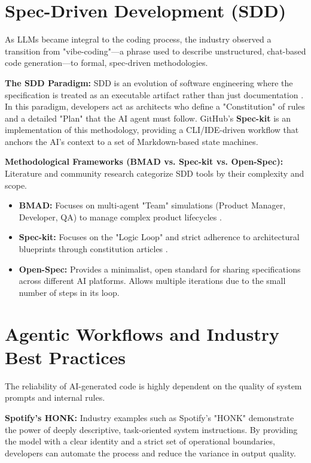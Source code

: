 \documentclass[a4paper,12pt]{report}
\begin{document}
\section{Spec-Driven Development (SDD)}
As LLMs became integral to the coding process, the industry observed a transition from "vibe-coding"—a phrase used to describe unstructured, chat-based code generation—to formal, spec-driven methodologies.

\textbf{The SDD Paradigm:} SDD is an evolution of software engineering where the specification is treated as an executable artifact rather than just documentation \cite{sogl_sdd}. In this paradigm, developers act as architects who define a "Constitution" of rules and a detailed "Plan" that the AI agent must follow. GitHub’s \textbf{Spec-kit} \cite{speckit_repo, gokcek_report} is an implementation of this methodology, providing a CLI/IDE-driven workflow that anchors the AI's context to a set of Markdown-based state machines.

\textbf{Methodological Frameworks (BMAD vs. Spec-kit vs. Open-Spec):} Literature and community research \cite{bmad_repo, bmad_vs_speckit_video} categorize SDD tools by their complexity and scope.
\begin{itemize}
\item \textbf{BMAD:} Focuses on multi-agent "Team" simulations (Product Manager, Developer, QA) to manage complex product lifecycles \cite{bmad_repo}.
\item \textbf{Spec-kit:} Focuses on the "Logic Loop" and strict adherence to architectural blueprints through constitution articles \cite{speckit_const_docs}.
\item \textbf{Open-Spec:} Provides a minimalist, open standard for sharing specifications across different AI platforms. Allows multiple iterations due to the small number of steps in its loop. \cite{openspec_repo}
\end{itemize}

\section{Agentic Workflows and Industry Best Practices}
The reliability of AI-generated code is highly dependent on the quality of system prompts and internal rules.

\textbf{Spotify's HONK:} Industry examples such as Spotify’s "HONK" \cite{spotify_honk} demonstrate the power of deeply descriptive, task-oriented system instructions. By providing the model with a clear identity and a strict set of operational boundaries, developers can automate the process and reduce the variance in output quality.
\end{document}
